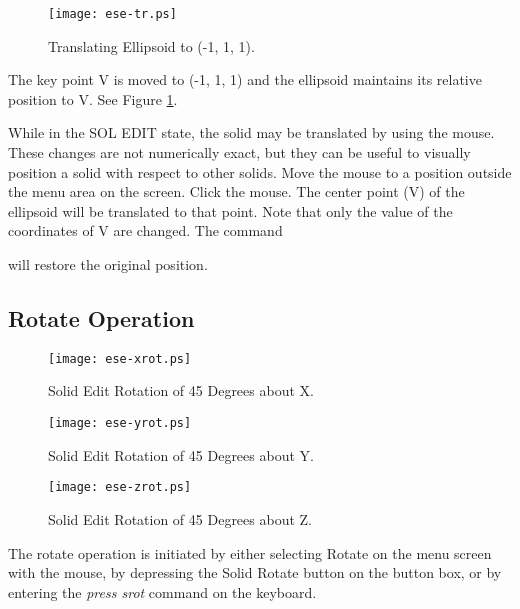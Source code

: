 \begin{figure}
\centering \texttt{[image: ese-tr.ps]}
\caption{Translating Ellipsoid to (-1, 1, 1).}
\label{ese-tr}
\end{figure}


The key point V is moved to (-1, 1, 1) and the ellipsoid maintains its
relative position to V.  See Figure \ref{ese-tr}.

While in the SOL EDIT state, the solid may be translated by
using the mouse.  These changes are not numerically exact, but they can be
useful to visually position a solid with respect to other solids.
Move the mouse to a position outside the menu area on the screen.
Click the mouse.
The center point (V) of the ellipsoid will be translated to that point.
Note that only the value of the coordinates of V are changed.
The command


will restore the original position.

\subsection{Rotate Operation}

\begin{figure}
\centering \texttt{[image: ese-xrot.ps]}
\caption{Solid Edit Rotation of 45 Degrees about X.}
\label{ese-xrot}
\end{figure}

\begin{figure}
\centering \texttt{[image: ese-yrot.ps]}
\caption{Solid Edit Rotation of 45 Degrees about Y.}
\label{ese-yrot}
\end{figure}

\begin{figure}
\centering \texttt{[image: ese-zrot.ps]}
\caption{Solid Edit Rotation of 45 Degrees about Z.}
\label{ese-zrot}
\end{figure}

The rotate operation is initiated by either selecting Rotate on the menu
screen with the mouse,
by depressing the Solid Rotate button on the button box,
or by entering the {\em press srot} command on the keyboard.


